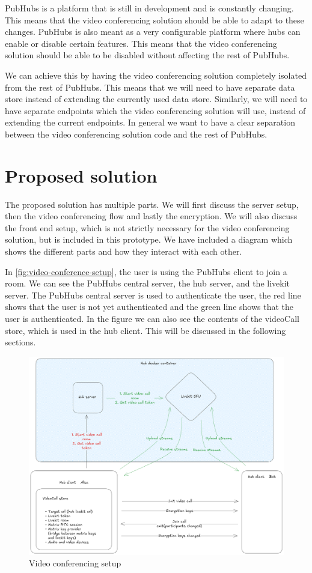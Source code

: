 \documentclass{report}
\begin{document}
PubHubs is a platform that is still in development and is constantly changing. This means that the video
conferencing solution should be able to adapt to these changes. PubHubs is also meant as a very configurable platform
where hubs can enable or disable certain features. This means that the video conferencing solution should be able to
be disabled without affecting the rest of PubHubs.

We can achieve this by having the video conferencing solution completely isolated from the rest of PubHubs.
This means that we will need to have separate data store instead of extending the currently used data store.
Similarly, we will need to have separate endpoints which the video conferencing solution will use,
instead of extending the current endpoints. In general we want to have a clear separation between the video conferencing
solution code and the rest of PubHubs.

\chapter{Proposed solution}
The proposed solution has multiple parts. We will first discuss the server setup, then the video conferencing flow
and lastly the encryption. We will also discuss the front end setup, which is not strictly necessary for the video
conferencing solution, but is included in this prototype. We have included a diagram which shows the different parts
and how they interact with each other.

In \autoref{fig:video-conference-setup}, the user is using the PubHubs client to join a room. We can see the PubHubs central server, the hub
server, and the livekit server. The PubHubs central server is used to authenticate the user, the red line shows that
the user is not yet authenticated and the green line shows that the user is authenticated. In the figure we can also see
the contents of the videoCall store, which is used in the hub client. This will be discussed in the following sections.

\begin{figure}[!hbt]
\centering
\includegraphics[width=1\textwidth]{img/PH_videocall.excalidraw.png}
\caption{Video conferencing setup}
\label{fig:video-conference-setup}
\end{figure}
\end{document}
